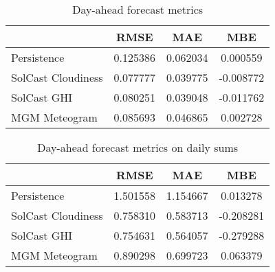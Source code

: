 \begin{table}[!t]
	\centering
	\caption{Day-ahead forecast metrics}
	\label{table:dayahead-metrics}
	\begin{tabular}{lS[table-format=1.3]S[table-format=1.3]>{}S[table-format=-1.4]}
		\toprule
		                       &   {RMSE}   &   {MAE}    &    {MBE}    \\
        \midrule
		Persistence & 0.125386 & 0.062034 & 0.000559 \\
		SolCast Cloudiness & 0.077777 & 0.039775 & -0.008772 \\
		SolCast GHI & 0.080251 & 0.039048 & -0.011762 \\
		MGM Meteogram & 0.085693 & 0.046865 & 0.002728 \\
		\bottomrule
	\end{tabular}
\end{table}

\begin{table}[!t]
	\centering
	\caption{Day-ahead forecast metrics on daily sums}
	\label{table:dayahead-metrics-sum}
	\begin{tabular}{lS[table-format=1.3]S[table-format=1.3]S[table-format=-1.3]}
		\toprule
		                       &   {RMSE}   &   {MAE}    &    {MBE}    \\
        \midrule
		Persistence & 1.501558 & 1.154667 & 0.013278 \\
		SolCast Cloudiness & 0.758310 & 0.583713 & -0.208281 \\
		SolCast GHI & 0.754631 & 0.564057 & -0.279288 \\
		MGM Meteogram & 0.890298 & 0.699723 & 0.063379 \\
		\bottomrule
	\end{tabular}
\end{table}


